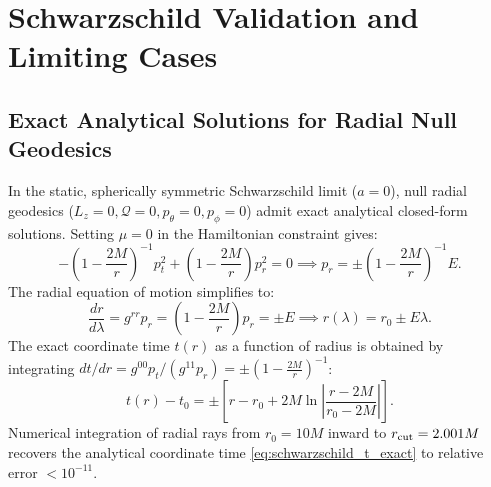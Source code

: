 \section{Schwarzschild Validation and Limiting Cases}
\label{sec:schwarzschild_validation}

\subsection{Exact Analytical Solutions for Radial Null Geodesics}
In the static, spherically symmetric Schwarzschild limit ($a = 0$), null radial geodesics ($L_z = 0, \mathcal{Q} = 0, p_\theta = 0, p_\phi = 0$) admit exact analytical closed-form solutions. Setting $\mu = 0$ in the Hamiltonian constraint gives:
\begin{equation}
    -\left(1 - \frac{2M}{r}\right)^{-1} p_t^2 + \left(1 - \frac{2M}{r}\right) p_r^2 = 0 \implies p_r = \pm \left(1 - \frac{2M}{r}\right)^{-1} E.
    \label{eq:schwarzschild_pr_null}
\end{equation}
The radial equation of motion simplifies to:
\begin{equation}
    \frac{dr}{d\lambda} = g^{rr} p_r = \left(1 - \frac{2M}{r}\right) p_r = \pm E \implies r(\lambda) = r_0 \pm E \lambda.
    \label{eq:schwarzschild_r_lambda}
\end{equation}
The exact coordinate time $t(r)$ as a function of radius is obtained by integrating $dt/dr = g^{00} p_t / (g^{11} p_r) = \pm \left(1 - \frac{2M}{r}\right)^{-1}$:
\begin{equation}
    t(r) - t_0 = \pm \left[ r - r_0 + 2M \ln\left| \frac{r - 2M}{r_0 - 2M} \right| \right].
    \label{eq:schwarzschild_t_exact}
\end{equation}
Numerical integration of radial rays from $r_0 = 10M$ inward to $r_{\rm cut} = 2.001M$ recovers the analytical coordinate time \eqref{eq:schwarzschild_t_exact} to relative error $< 10^{-11}$.

